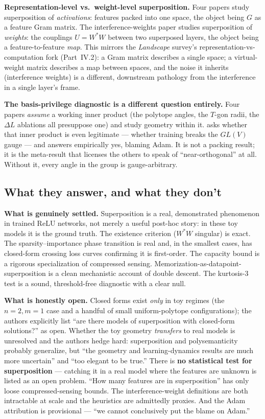 \textbf{Representation-level vs.\ weight-level superposition.} Four papers study superposition of \emph{activations}: features packed into one space, the object being $G$ as a feature Gram matrix. The interference-weights paper studies superposition of \emph{weights}: the couplings $U = W^{*}W$ between two superposed layers, the object being a feature-to-feature \emph{map}. This mirrors the \emph{Landscape} survey's representation-vs-computation fork (Part~IV.2): a Gram matrix describes a single space; a virtual-weight matrix describes a map between spaces, and the noise it inherits (interference weights) is a different, downstream pathology from the interference in a single layer's frame.

\textbf{The basis-privilege diagnostic is a different question entirely.} Four papers \emph{assume} a working inner product (the polytope angles, the $T$-gon radii, the $\Delta L$ ablations all presuppose one) and study geometry within it. \textcite{privileged-bases-residual-stream} asks whether that inner product is even legitimate --- whether training breaks the $GL(V)$ gauge --- and answers empirically yes, blaming Adam. It is not a packing result; it is the meta-result that licenses the others to speak of ``near-orthogonal'' at all. Without it, every angle in the group is gauge-arbitrary.


\subsection*{What they answer, and what they don't}

\textbf{What is genuinely settled.} Superposition is a real, demonstrated phenomenon in trained ReLU networks, not merely a useful post-hoc story: in these toy models it is the ground truth. The existence criterion ($W^{*}W$ singular) is exact. The sparsity--importance phase transition is real and, in the smallest cases, has closed-form crossing loss curves confirming it is first-order. The capacity bound is a rigorous specialization of compressed sensing. Memorization-as-datapoint-superposition is a clean mechanistic account of double descent. The kurtosis-3 test is a sound, threshold-free diagnostic with a clear null.

\textbf{What is honestly open.} Closed forms exist \emph{only} in toy regimes (the $n=2,m=1$ case and a handful of small uniform-polytope configurations); the authors explicitly list ``are there models of superposition with closed-form solutions?'' as open. Whether the toy geometry \emph{transfers} to real models is unresolved and the authors hedge hard: superposition and polysemanticity probably generalize, but ``the geometry and learning-dynamics results are much more uncertain'' and ``too elegant to be true.'' There is \textbf{no statistical test for superposition} --- catching it in a real model where the features are unknown is listed as an open problem. ``How many features are in superposition'' has only loose compressed-sensing bounds. The interference-weight definitions are both intractable at scale and the heuristics are admittedly proxies. And the Adam attribution is provisional --- ``we cannot conclusively put the blame on Adam.''

